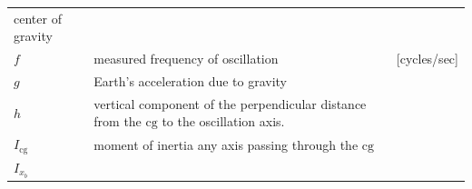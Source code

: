 \documentclass[
]{book}
\begin{document}
\begin{longtable}[]{@{}lll@{}}
\begin{minipage}[t]{0.68\columnwidth}
center of gravity\strut
\end{minipage} & \begin{minipage}[t]{0.10\columnwidth}\raggedright
\strut
\end{minipage}\tabularnewline
\begin{minipage}[t]{0.14\columnwidth}\raggedright
\(f\)\strut
\end{minipage} & \begin{minipage}[t]{0.68\columnwidth}\raggedright
measured frequency of oscillation\strut
\end{minipage} & \begin{minipage}[t]{0.10\columnwidth}\raggedright
{[}cycles/sec{]}\strut
\end{minipage}\tabularnewline
\begin{minipage}[t]{0.14\columnwidth}\raggedright
\(g\)\strut
\end{minipage} & \begin{minipage}[t]{0.68\columnwidth}\raggedright
Earth's acceleration due to gravity\strut
\end{minipage} & \begin{minipage}[t]{0.10\columnwidth}\raggedright
\strut
\end{minipage}\tabularnewline
\begin{minipage}[t]{0.14\columnwidth}\raggedright
\(h\)\strut
\end{minipage} & \begin{minipage}[t]{0.68\columnwidth}\raggedright
vertical component of the perpendicular distance from the \(\mathrm{cg}\) to the oscillation axis.\strut
\end{minipage} & \begin{minipage}[t]{0.10\columnwidth}\raggedright
\strut
\end{minipage}\tabularnewline
\begin{minipage}[t]{0.14\columnwidth}\raggedright
\(I_{\mathrm{cg}}\)\strut
\end{minipage} & \begin{minipage}[t]{0.68\columnwidth}\raggedright
moment of inertia any axis passing through the \(\mathrm{cg}\)\strut
\end{minipage} & \begin{minipage}[t]{0.10\columnwidth}\raggedright
\strut
\end{minipage}\tabularnewline
\begin{minipage}[t]{0.14\columnwidth}\raggedright
\(I_{x_b}\)\strut
\end{minipage} & \begin{minipage}[t]{0.68\columnwidth}\raggedright

\end{minipage}
\end{longtable}
\end{document}
